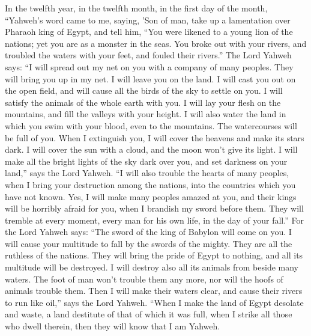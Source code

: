  In the twelfth year, in the twelfth month, in the first
day of the month, ``Yahweh's word came to me, saying, 
'Son of man, take up a lamentation over Pharaoh king of Egypt, and tell
him, ``You were likened to a young lion of the nations; yet you are as a
monster in the seas. You broke out with your rivers, and troubled the
waters with your feet, and fouled their rivers.''  The
Lord Yahweh says: ``I will spread out my net on you with a company of
many peoples. They will bring you up in my net.  I will
leave you on the land. I will cast you out on the open field, and will
cause all the birds of the sky to settle on you. I will satisfy the
animals of the whole earth with you.  I will lay your
flesh on the mountains, and fill the valleys with your height.
 I will also water the land in which you swim with your
blood, even to the mountains. The watercourses will be full of you.
 When I extinguish you, I will cover the heavens and make
its stars dark. I will cover the sun with a cloud, and the moon won't
give its light.  I will make all the bright lights of the
sky dark over you, and set darkness on your land,'' says the Lord
Yahweh.  ``I will also trouble the hearts of many peoples,
when I bring your destruction among the nations, into the countries
which you have not known.  Yes, I will make many peoples
amazed at you, and their kings will be horribly afraid for you, when I
brandish my sword before them. They will tremble at every moment, every
man for his own life, in the day of your fall.''  For the
Lord Yahweh says: ``The sword of the king of Babylon will come on you.
 I will cause your multitude to fall by the swords of the
mighty. They are all the ruthless of the nations. They will bring the
pride of Egypt to nothing, and all its multitude will be destroyed.
 I will destroy also all its animals from beside many
waters. The foot of man won't trouble them any more, nor will the hoofs
of animals trouble them.  Then I will make their waters
clear, and cause their rivers to run like oil,'' says the Lord Yahweh.
 ``When I make the land of Egypt desolate and waste, a
land destitute of that of which it was full, when I strike all those who
dwell therein, then they will know that I am Yahweh.

